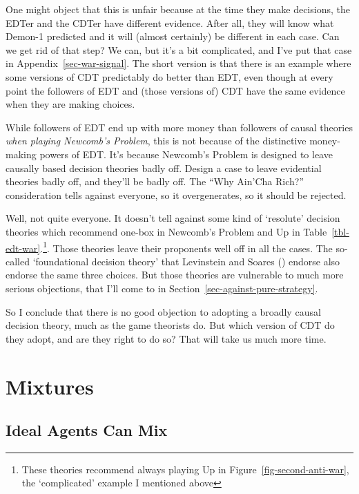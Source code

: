 \documentclass[
  12pt,
  letterpaper,
  DIV=11,
  numbers=noendperiod]{scrreprt}
\begin{document}
One might object that this is unfair because at the time they make
decisions, the EDTer and the CDTer have different evidence. After all,
they will know what Demon-1 predicted and it will (almost certainly) be
different in each case. Can we get rid of that step? We can, but it's a
bit complicated, and I've put that case in
Appendix~\ref{sec-war-signal}. The short version is that there is an
example where some versions of CDT predictably do better than EDT, even
though at every point the followers of EDT and (those versions of) CDT
have the same evidence when they are making choices.

While followers of EDT end up with more money than followers of causal
theories \emph{when playing Newcomb's Problem}, this is not because of
the distinctive money-making powers of EDT. It's because Newcomb's
Problem is designed to leave causally based decision theories badly off.
Design a case to leave evidential theories badly off, and they'll be
badly off. The ``Why Ain'Cha Rich?'' consideration tells against
everyone, so it overgenerates, so it should be rejected.

Well, not quite everyone. It doesn't tell against some kind of
`resolute' decision theories which recommend one-box in Newcomb's
Problem and Up in Table~\ref{tbl-edt-war}.\footnote{These theories
  recommend always playing Up in Figure~\ref{fig-second-anti-war}, the
  `complicated' example I mentioned above}. Those theories leave their
proponents well off in all the cases. The so-called `foundational
decision theory' that Levinstein and Soares
() endorse also endorse the
same three choices. But those theories are vulnerable to much more
serious objections, that I'll come to in
Section~\ref{sec-against-pure-strategy}.

So I conclude that there is no good objection to adopting a broadly
causal decision theory, much as the game theorists do. But which version
of CDT do they adopt, and are they right to do so? That will take us
much more time.


\chapter{Mixtures}\label{sec-mixed}

\section{Ideal Agents Can Mix}\label{ideal-agents-can-mix}
\end{document}
